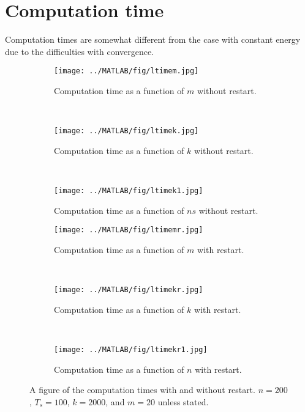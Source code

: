 \section{Computation time} %
Computation times are somewhat different from the case with constant energy due to the difficulties with convergence. 
\begin{figure}[H]
        \centering
        \begin{subfigure}[b]{0.3\textwidth}
                \texttt{[image: ../MATLAB/fig/ltimem.jpg]}
                \caption{ Computation time as a function of $m$ without restart. }
                \label{fig:ltimem}
        \end{subfigure}
        ~
        \begin{subfigure}[b]{0.3\textwidth}
                \texttt{[image: ../MATLAB/fig/ltimek.jpg]}
                \caption{ Computation time as a function of $k$ without restart. }
                \label{fig:ltimek}
        \end{subfigure}
        ~
        \begin{subfigure}[b]{0.3\textwidth}
                \texttt{[image: ../MATLAB/fig/ltimek1.jpg]}
                \caption{ Computation time as a function of $ns$ without restart. }
                \label{fig:ltimek1}
        \end{subfigure}
        
                \begin{subfigure}[b]{0.3\textwidth}
                \texttt{[image: ../MATLAB/fig/ltimemr.jpg]}
                \caption{ Computation time as a function of $m$ with restart. }
                \label{fig:ltimemr}
        \end{subfigure}
        ~
        \begin{subfigure}[b]{0.3\textwidth}
                \texttt{[image: ../MATLAB/fig/ltimekr.jpg]}
                \caption{ Computation time as a function of $k$ with restart. }
                \label{fig:ltimekr}
        \end{subfigure}
        ~
        \begin{subfigure}[b]{0.3\textwidth}
                \texttt{[image: ../MATLAB/fig/ltimekr1.jpg]}
                \caption{ Computation time as a function of $n$ with restart. }
                \label{fig:ltimekr1}
        \end{subfigure}
        \caption{ A figure of the computation times with and without restart. $n = 200$, $T_s = 100$, $k = 2000$, and $m = 20$ unless stated. }
        \label{fig:ltime0}
\end{figure}
